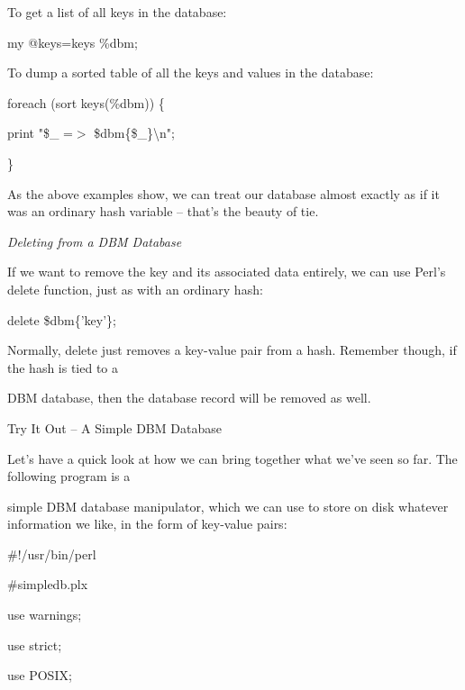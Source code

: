 \documentclass[a4paper,11pt]{book}
\begin{document}
\noindent 

\noindent To get a list of all keys in the database:

\noindent 

\noindent my @keys=keys \%dbm;

\noindent 

\noindent To dump a sorted table of all the keys and values in the database:

\noindent 

\noindent foreach (sort keys(\%dbm)) \{

\noindent print "\$\_  =$>$ \$dbm\{\$\_\}\textbackslash n";

\noindent \}

\noindent 

\noindent As the above examples show, we can treat our database almost exactly as if it was an ordinary hash variable -- that's the beauty of tie.

\noindent 

\noindent \textit{Deleting from a DBM Database}

\noindent If we want to remove the key and its associated data entirely, we can use Perl's delete function, just as with an ordinary hash:

\noindent 

\noindent delete \$dbm\{'key'\};

\noindent 

\noindent Normally, delete just removes a key-value pair from a hash. Remember though, if the hash is tied to a

\noindent DBM database, then the database record will be removed as well.

\noindent 

\noindent Try It Out -- A Simple DBM Database

\noindent 

\noindent Let's have a quick look at how we can bring together what we've seen so far. The following program is a

\noindent simple DBM database manipulator, which we can use to store on disk whatever information we like, in the form of key-value pairs:

\noindent 

\noindent \#!/usr/bin/perl

\noindent \#simpledb.plx

\noindent use warnings;

\noindent use strict;

\noindent use POSIX;
\end{document}
